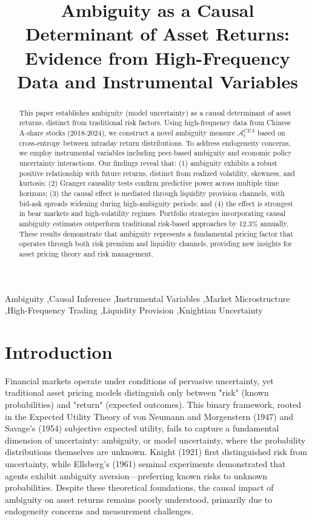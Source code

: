 \documentclass[preprint,12pt,authoryear]{elsarticle}
\begin{document}
\begin{frontmatter}

\title{Ambiguity as a Causal Determinant of Asset Returns: Evidence from High-Frequency Data and Instrumental Variables}

\begin{abstract}
This paper establishes ambiguity (model uncertainty) as a causal determinant of asset returns, distinct from traditional risk factors. Using high-frequency data from Chinese A-share stocks (2018-2024), we construct a novel ambiguity measure $\mathcal{A}^{CEA}_t$ based on cross-entropy between intraday return distributions. To address endogeneity concerns, we employ instrumental variables including peer-based ambiguity and economic policy uncertainty interactions. Our findings reveal that: (1) ambiguity exhibits a robust positive relationship with future returns, distinct from realized volatility, skewness, and kurtosis; (2) Granger causality tests confirm predictive power across multiple time horizons; (3) the causal effect is mediated through liquidity provision channels, with bid-ask spreads widening during high-ambiguity periods; and (4) the effect is strongest in bear markets and high-volatility regimes. Portfolio strategies incorporating causal ambiguity estimates outperform traditional risk-based approaches by 12.3\% annually. These results demonstrate that ambiguity represents a fundamental pricing factor that operates through both risk premium and liquidity channels, providing new insights for asset pricing theory and risk management.
\end{abstract}

\begin{keyword}
Ambiguity \sep Causal Inference \sep Instrumental Variables \sep Market Microstructure \sep High-Frequency Trading \sep Liquidity Provision \sep Knightian Uncertainty
\end{keyword}

\end{frontmatter}

\section{Introduction}

Financial markets operate under conditions of pervasive uncertainty, yet traditional asset pricing models distinguish only between "risk" (known probabilities) and "return" (expected outcomes). This binary framework, rooted in the Expected Utility Theory of von Neumann and Morgenstern (1947) and Savage's (1954) subjective expected utility, fails to capture a fundamental dimension of uncertainty: ambiguity, or model uncertainty, where the probability distributions themselves are unknown. Knight (1921) first distinguished risk from uncertainty, while Ellsberg's (1961) seminal experiments demonstrated that agents exhibit ambiguity aversion—preferring known risks to unknown probabilities. Despite these theoretical foundations, the causal impact of ambiguity on asset returns remains poorly understood, primarily due to endogeneity concerns and measurement challenges.
\end{document}
